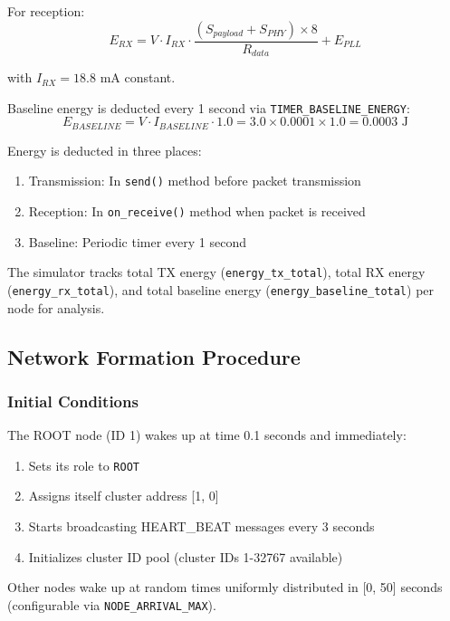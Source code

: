 \documentclass[conference]{IEEEtran}
\begin{document}
For reception:
\begin{equation}
E_{RX} = V \cdot I_{RX} \cdot \frac{(S_{payload} + S_{PHY}) \times 8}{R_{data}} + E_{PLL}
\end{equation}

with $I_{RX} = 18.8$ mA constant.

Baseline energy is deducted every 1 second via \texttt{TIMER\_BASELINE\_ENERGY}:
\begin{equation}
E_{BASELINE} = V \cdot I_{BASELINE} \cdot 1.0 = 3.0 \times 0.0001 \times 1.0 = 0.0003 \text{ J}
\end{equation}

Energy is deducted in three places:
\begin{enumerate}
    \item Transmission: In \texttt{send()} method before packet transmission
    \item Reception: In \texttt{on\_receive()} method when packet is received
    \item Baseline: Periodic timer every 1 second
\end{enumerate}

The simulator tracks total TX energy (\texttt{energy\_tx\_total}), total RX energy (\texttt{energy\_rx\_total}), and total baseline energy (\texttt{energy\_baseline\_total}) per node for analysis.

\subsection{Network Formation Procedure}

\subsubsection{Initial Conditions}
The ROOT node (ID 1) wakes up at time 0.1 seconds and immediately:
\begin{enumerate}
    \item Sets its role to \texttt{ROOT}
    \item Assigns itself cluster address [1, 0]
    \item Starts broadcasting HEART\_BEAT messages every 3 seconds
    \item Initializes cluster ID pool (cluster IDs 1-32767 available)
\end{enumerate}

Other nodes wake up at random times uniformly distributed in [0, 50] seconds (configurable via \texttt{NODE\_ARRIVAL\_MAX}).
\end{document}
